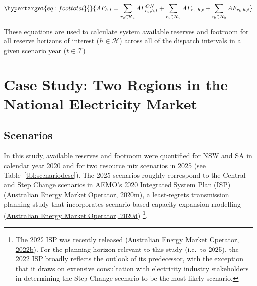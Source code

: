 \documentclass[12pt,a4paper,]{report}
\begin{document}
\begin{equation}\protect\hypertarget{eq:foottotal}{}{ AF_{h,t}=\sum_{r_c \in \mathcal{R}_c}{AF_{r_c,h,t}^{ON}} + \sum_{r_v \in \mathcal{R}_v}{AF_{r_v,h,t}} + \sum_{r_b \in \mathcal{R}_b}{AF_{r_b,h,t}} }\label{eq:foottotal}\end{equation}

These equations are used to calculate system available reserves and
footroom for all reserve horizons of interest (\(h \in \mathcal{H}\))
across all of the dispatch intervals in a given scenario year
(\(t \in \mathcal{T}\)).

\hypertarget{sec:reserves-casestudy}{%
\section{Case Study: Two Regions in the National Electricity
Market}\label{sec:reserves-casestudy}}

\hypertarget{scenarios}{%
\subsection{Scenarios}\label{scenarios}}

In this study, available reserves and footroom were quantified for NSW
and SA in calendar year 2020 and for two resource mix scenarios in 2025
(see Table~\ref{tbl:scenariodesc}). The 2025 scenarios roughly
correspond to the Central and Step Change scenarios in AEMO's 2020
Integrated System Plan (ISP)
(\protect\hyperlink{ref-australianenergymarketoperator2020ISPGeneration2020}{Australian
Energy Market Operator, 2020m}), a least-regrets transmission planning
study that incorporates scenario-based capacity expansion modelling
(\protect\hyperlink{ref-australianenergymarketoperator2020IntegratedSystem2020}{Australian
Energy Market Operator, 2020d}) \footnote{The 2022 ISP was recently
  released
  (\protect\hyperlink{ref-australianenergymarketoperator2022IntegratedSystem2022}{Australian
  Energy Market Operator, 2022b}). For the planning horizon relevant to
  this study (i.e.~to 2025), the 2022 ISP broadly reflects the outlook
  of its predecessor, with the exception that it draws on extensive
  consultation with electricity industry stakeholders in determining the
  Step Change scenario to be the most likely scenario.}.
\end{document}
